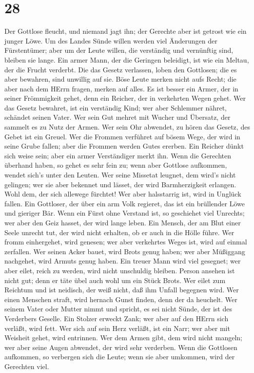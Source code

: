 \hypertarget{section-27}{%
\section{28}\label{section-27}}

 Der Gottlose fleucht, und niemand jagt ihn; der Gerechte
aber ist getrost wie ein junger Löwe.  Um des Landes Sünde
willen werden viel Änderungen der Fürstentümer; aber um der Leute
willen, die verständig und vernünftig sind, bleiben sie lange.
 Ein armer Mann, der die Geringen beleidigt, ist wie ein
Meltau, der die Frucht verderbt.  Die das Gesetz verlassen,
loben den Gottlosen; die es aber bewahren, sind unwillig auf sie.
 Böse Leute merken nicht aufs Recht; die aber nach dem HErrn
fragen, merken auf alles.  Es ist besser ein Armer, der in
seiner Frömmigkeit gehet, denn ein Reicher, der in verkehrten Wegen
gehet.  Wer das Gesetz bewahret, ist ein verständig Kind;
wer aber Schlemmer nähret, schändet seinen Vater.  Wer sein
Gut mehret mit Wucher und Übersatz, der sammelt es zu Nutz der Armen.
 Wer sein Ohr abwendet, zu hören das Gesetz, des Gebet ist
ein Greuel.  Wer die Frommen verführet auf bösem Wege, der
wird in seine Grube fallen; aber die Frommen werden Gutes ererben.
 Ein Reicher dünkt sich weise sein; aber ein armer
Verständiger merkt ihn.  Wenn die Gerechten überhand haben,
so gehet es sehr fein zu; wenn aber Gottlose aufkommen, wendet sich's
unter den Leuten.  Wer seine Missetat leugnet, dem wird's
nicht gelingen; wer sie aber bekennet und lässet, der wird
Barmherzigkeit erlangen.  Wohl dem, der sich allewege
fürchtet! Wer aber halsstarrig ist, wird in Unglück fallen.
 Ein Gottloser, der über ein arm Volk regieret, das ist ein
brüllender Löwe und gieriger Bär.  Wenn ein Fürst ohne
Verstand ist, so geschiehet viel Unrechts; wer aber den Geiz hasset, der
wird lange leben.  Ein Mensch, der am Blut einer Seele
unrecht tut, der wird nicht erhalten, ob er auch in die Hölle führe.
 Wer fromm einhergehet, wird genesen; wer aber verkehrtes
Weges ist, wird auf einmal zerfallen.  Wer seinen Acker
bauet, wird Brots genug haben; wer aber Müßiggang nachgehet, wird Armuts
genug haben.  Ein treuer Mann wird viel gesegnet; wer aber
eilet, reich zu werden, wird nicht unschuldig bleiben. 
Person ansehen ist nicht gut; denn er täte übel auch wohl um ein Stück
Brots.  Wer eilet zum Reichtum und ist neidisch, der weiß
nicht, daß ihm Unfall begegnen wird.  Wer einen Menschen
straft, wird hernach Gunst finden, denn der da heuchelt. 
Wer seinem Vater oder Mutter nimmt und spricht, es sei nicht Sünde, der
ist des Verderbers Geselle.  Ein Stolzer erweckt Zank; wer
aber auf den HErrn sich verläßt, wird fett.  Wer sich auf
sein Herz verläßt, ist ein Narr; wer aber mit Weisheit gehet, wird
entrinnen.  Wer dem Armen gibt, dem wird nicht mangeln; wer
aber seine Augen abwendet, der wird sehr verderben.  Wenn
die Gottlosen aufkommen, so verbergen sich die Leute; wenn sie aber
umkommen, wird der Gerechten viel.

